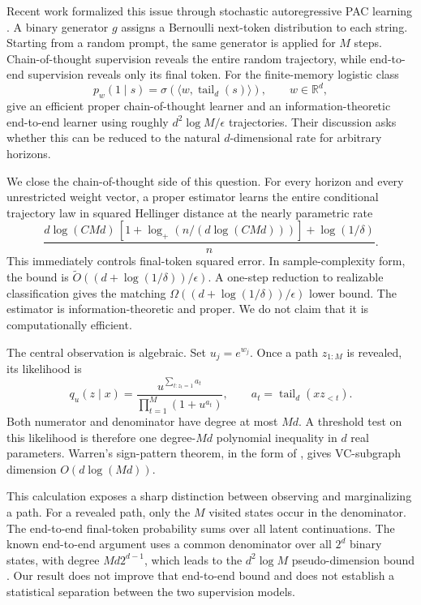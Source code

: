 \documentclass{article}
\theoremstyle{definition}
\theoremstyle{remark}
\newcommand{\tail}{\operatorname{tail}}
\begin{document}
Recent work formalized this issue through stochastic autoregressive PAC learning \citep{doronarad2026stochastic}. A binary generator $g$ assigns a Bernoulli next-token distribution to each string. Starting from a random prompt, the same generator is applied for $M$ steps. Chain-of-thought supervision reveals the entire random trajectory, while end-to-end supervision reveals only its final token. For the finite-memory logistic class \[ p_w(1\mid s)=\sigma(\langle w,\tail_d(s)\rangle),\qquad w\in\mathbb R^d, \] \citet{doronarad2026stochastic} give an efficient proper chain-of-thought learner and an information-theoretic end-to-end learner using roughly $d^2\log M/\epsilon$ trajectories. Their discussion asks whether this can be reduced to the natural $d$-dimensional rate for arbitrary horizons.

We close the chain-of-thought side of this question. For every horizon and every unrestricted weight vector, a proper estimator learns the entire conditional trajectory law in squared Hellinger distance at the nearly parametric rate
\begin{equation}
\label{eq:intro-rate}
\frac{d\log(CMd)\,[1+\log_+(n/(d\log(CMd)))]+\log(1/\delta)}{n}.
\end{equation}
This immediately controls final-token squared error. In sample-complexity form, the bound is $\widetilde O((d+\log(1/\delta))/\epsilon)$. A one-step reduction to realizable classification gives the matching $\Omega((d+\log(1/\delta))/\epsilon)$ lower bound. The estimator is information-theoretic and proper. We do not claim that it is computationally efficient.

The central observation is algebraic. Set $u_j=e^{w_j}$. Once a path $z_{1:M}$ is revealed, its likelihood is
\begin{equation}
\label{eq:intro-likelihood}
q_u(z\mid x)=\frac{u^{\sum_{t:z_t=1}a_t}}{\prod_{t=1}^M(1+u^{a_t})},
\qquad a_t=\tail_d(xz_{<t}).
\end{equation}
Both numerator and denominator have degree at most $Md$. A threshold test on this likelihood is therefore one degree-$Md$ polynomial inequality in $d$ real parameters. Warren's sign-pattern theorem, in the form of \citet{goldberg1995bounding}, gives VC-subgraph dimension $O(d\log(Md))$.

This calculation exposes a sharp distinction between observing and marginalizing a path. For a revealed path, only the $M$ visited states occur in the denominator. The end-to-end final-token probability sums over all latent continuations. The known end-to-end argument uses a common denominator over all $2^d$ binary states, with degree $Md2^{d-1}$, which leads to the $d^2\log M$ pseudo-dimension bound \citep{doronarad2026stochastic}. Our result does not improve that end-to-end bound and does not establish a statistical separation between the two supervision models.
\end{document}
